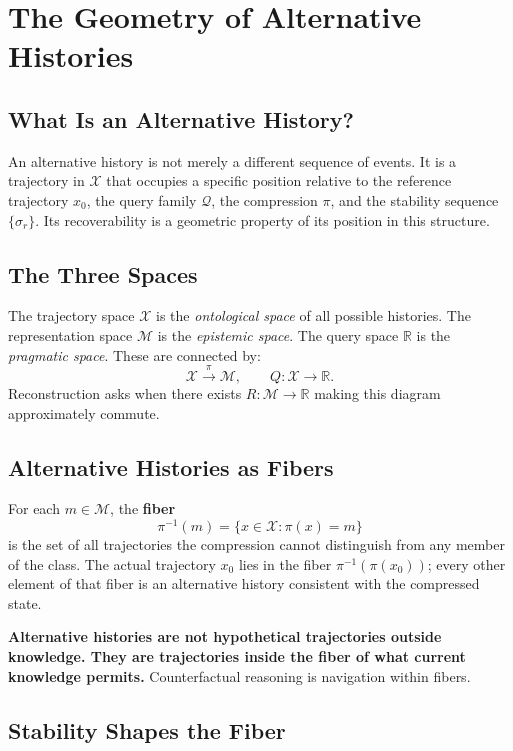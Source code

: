 \chapter{The Geometry of Alternative Histories}

\section{What Is an Alternative History?}

An alternative history is not merely a different sequence of events. It is a trajectory in $\mathcal{X}$ that occupies a specific position relative to the reference trajectory $x_0$, the query family $\mathcal{Q}$, the compression $\pi$, and the stability sequence $\{\sigma_r\}$. Its recoverability is a geometric property of its position in this structure.

\section{The Three Spaces}

The trajectory space $\mathcal{X}$ is the \emph{ontological space} of all possible histories. The representation space $\mathcal{M}$ is the \emph{epistemic space}. The query space $\mathbb{R}$ is the \emph{pragmatic space}. These are connected by:
\[
  \mathcal{X} \xrightarrow{\pi} \mathcal{M}, \qquad Q : \mathcal{X} \to \mathbb{R}.
\]
Reconstruction asks when there exists $R : \mathcal{M} \to \mathbb{R}$ making this diagram approximately commute.

\section{Alternative Histories as Fibers}

For each $m \in \mathcal{M}$, the \textbf{fiber}
\[
  \pi^{-1}(m) = \{x \in \mathcal{X} : \pi(x) = m\}
\]
is the set of all trajectories the compression cannot distinguish from any member of the class. The actual trajectory $x_0$ lies in the fiber $\pi^{-1}(\pi(x_0))$; every other element of that fiber is an alternative history consistent with the compressed state.

\textbf{Alternative histories are not hypothetical trajectories outside knowledge. They are trajectories inside the fiber of what current knowledge permits.} Counterfactual reasoning is navigation within fibers.

\section{Stability Shapes the Fiber}

